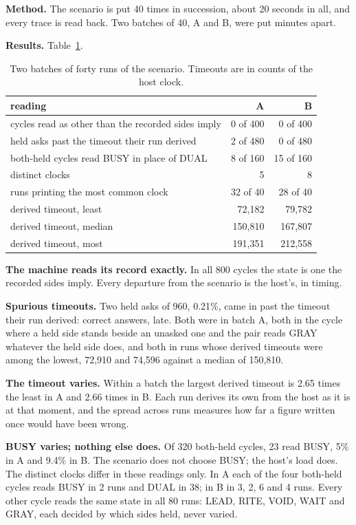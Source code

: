 \textbf{Method.} The scenario is put 40 times in succession, about 20 seconds in all, and every
trace is read back. Two batches of 40, A and B, were put minutes apart.

\textbf{Results.} Table~\ref{tab:repeat}.

\begin{table}[h]
\centering
\small
\begin{tabular}{@{}l r r@{}}
\toprule
reading & A & B \\
\midrule
cycles read as other than the recorded sides imply & 0 of 400 & 0 of 400 \\
held asks past the timeout their run derived & 2 of 480 & 0 of 480 \\
both-held cycles read BUSY in place of DUAL & 8 of 160 & 15 of 160 \\
distinct clocks & 5 & 8 \\
runs printing the most common clock & 32 of 40 & 28 of 40 \\
derived timeout, least & 72,182 & 79,782 \\
derived timeout, median & 150,810 & 167,807 \\
derived timeout, most & 191,351 & 212,558 \\
\bottomrule
\end{tabular}
\caption{Two batches of forty runs of the scenario. Timeouts are in counts of the host clock.}
\label{tab:repeat}
\end{table}

\textbf{The machine reads its record exactly.} In all 800 cycles the state is one the recorded
sides imply. Every departure from the scenario is the host's, in timing.

\textbf{Spurious timeouts.} Two held asks of 960, 0.21\%, came in past the timeout their run
derived: correct answers, late. Both were in batch A, both in the cycle where a held side stands
beside an unasked one and the pair reads GRAY whatever the held side does, and both in runs whose
derived timeouts were among the lowest, 72,910 and 74,596 against a median of 150,810.

\textbf{The timeout varies.} Within a batch the largest derived timeout is 2.65 times the least in
A and 2.66 times in B. Each run derives its own from the host as it is at that moment, and the
spread across runs measures how far a figure written once would have been wrong.

\textbf{BUSY varies; nothing else does.} Of 320 both-held cycles, 23 read BUSY, 5\% in A and 9.4\%
in B. The scenario does not choose BUSY; the host's load does. The distinct clocks differ in these
readings only. In A each of the four both-held cycles reads BUSY in 2 runs and DUAL in 38; in B in
3, 2, 6 and 4 runs. Every other cycle reads the same state in all 80 runs: LEAD, RITE, VOID, WAIT
and GRAY, each decided by which sides held, never varied.

